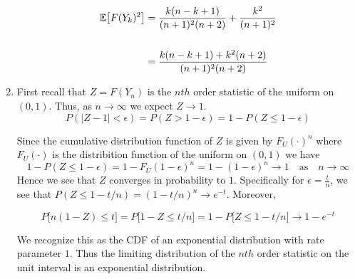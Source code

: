 \documentclass[12pt]{article}  %
\newcommand{\e}{{\epsilon}}
\newcommand{\E}{{\mathbb{E}}}
\begin{document}
\begin{enumerate}
\begin{align*}
\E\big[F(Y_k)^2\big] &= \frac{k(n-k+1)}{(n+1)^2(n+2)} + \frac{k^2}{(n+1)^2}\\
\vspace{.3em}\\
&= \frac{k(n-k+1) + k^2(n+2)}{(n+1)^2(n+2)}
\end{align*} 

\item First recall that $Z = F(Y_n)$ is the $nth$ order statistic of the uniform on $(0,1)$. Thus, as $n\to\infty$ we expect $Z\to 1$. $$P(|Z - 1|<\e) = P(Z > 1- \e) = 1 - P(Z\leq 1 - \e)$$

Since the cumulative distribution function of $Z$ is given by $F_{U}(\cdot)^n$ where $F_{U}(\cdot)$ is the distribition function of the uniform on $(0,1)$ we have $$1 - P(Z\leq 1-\e) = 1 - F_{U}(1-\e)^n = 1 - (1-\e)^n \to 1\hspace{1em}\text{as}\hspace{1em} n\to\infty$$ Hence we see that $Z$ converges in probability to $1$. Specifically for $\e = \frac{t}{n}$, we see that $P(Z\leq 1 - t/n) = \left(1 - t/n\right)^n\to e^{-t}$. Moreover, 

$$P\big[n(1 - Z)\leq t\big] = P\big[1 - Z\leq t/n\big] = 1- P\big[Z\leq 1 - t/n\big] \to 1 - e^{-t}$$

We recognize this as the CDF of an exponential distribution with rate parameter $1$. Thus the limiting distribution of the $nth$ order statistic on the unit interval is an exponential distribution. 


\end{enumerate}
\end{document}
